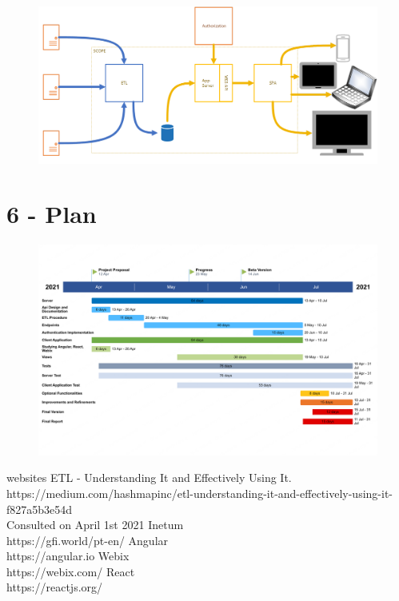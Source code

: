 \documentclass[a4paper,twoside,10pt]{article}
\begin{document}
\begin{figure}[!htb]
\includegraphics[scale = 0.25, center]{image002.png}
\end{figure}

\pagebreak
\section*{6 - Plan}
\begin{figure}[!htb]
\includegraphics[scale = 0.2, center]{test.png}
\end{figure}




\begin{thebibliography} {websites}
 ETL - Understanding It and Effectively Using It.\\
https://medium.com/hashmapinc/etl-understanding-it-and-effectively-using-it-f827a5b3e54d\\
Consulted on April 1st 2021
 Inetum\\ https://gfi.world/pt-en/
 Angular\\ https://angular.io
 Webix\\ https://webix.com/
 React\\ https://reactjs.org/

\end{thebibliography} 
\end{document}
